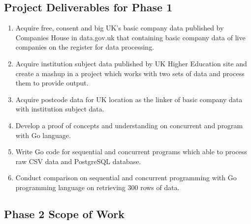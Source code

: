 \subsection{Project Deliverables for Phase 1}

\begin{enumerate}[topsep=0pt,itemsep=-1ex,partopsep=1ex,parsep=1.5ex]
\item Acquire free, consent and big UK’s basic company data published by Companies House in data.gov.uk that containing basic company data of live companies on the register for data processing.
\item Acquire institution subject data published by UK Higher Education site and create a mashup in a project which works with two sets of data and process them to provide output. 
\item Acquire postcode data for UK location as the linker of basic company data with institution subject data. 
\item Develop a proof of concepts and understanding on concurrent and program with Go language.
\item Write Go code for sequential and concurrent programs which able to process raw CSV data and PostgreSQL database. 
\item Conduct comparison on sequential and concurrent programming with Go programming language on retrieving 300 rows of data. 

\end{enumerate}

\subsection{Phase 2 Scope of Work}

